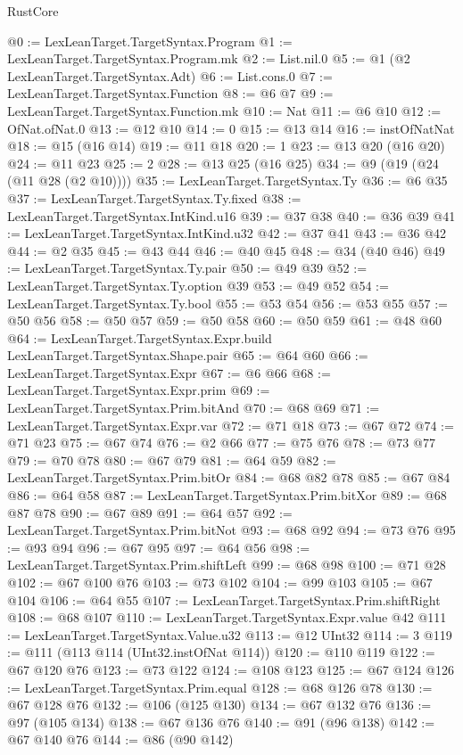 \begin{lexlean}{RustCore}
\begin{coremodule}
@0 := LexLeanTarget.TargetSyntax.Program
@1 := LexLeanTarget.TargetSyntax.Program.mk
@2 := List.nil.{0}
@5 := @1 (@2 LexLeanTarget.TargetSyntax.Adt)
@6 := List.cons.{0}
@7 := LexLeanTarget.TargetSyntax.Function
@8 := @6 @7
@9 := LexLeanTarget.TargetSyntax.Function.mk
@10 := Nat
@11 := @6 @10
@12 := OfNat.ofNat.{0}
@13 := @12 @10
@14 := 0
@15 := @13 @14
@16 := instOfNatNat
@18 := @15 (@16 @14)
@19 := @11 @18
@20 := 1
@23 := @13 @20 (@16 @20)
@24 := @11 @23
@25 := 2
@28 := @13 @25 (@16 @25)
@34 := @9 (@19 (@24 (@11 @28 (@2 @10))))
@35 := LexLeanTarget.TargetSyntax.Ty
@36 := @6 @35
@37 := LexLeanTarget.TargetSyntax.Ty.fixed
@38 := LexLeanTarget.TargetSyntax.IntKind.u16
@39 := @37 @38
@40 := @36 @39
@41 := LexLeanTarget.TargetSyntax.IntKind.u32
@42 := @37 @41
@43 := @36 @42
@44 := @2 @35
@45 := @43 @44
@46 := @40 @45
@48 := @34 (@40 @46)
@49 := LexLeanTarget.TargetSyntax.Ty.pair
@50 := @49 @39
@52 := LexLeanTarget.TargetSyntax.Ty.option @39
@53 := @49 @52
@54 := LexLeanTarget.TargetSyntax.Ty.bool
@55 := @53 @54
@56 := @53 @55
@57 := @50 @56
@58 := @50 @57
@59 := @50 @58
@60 := @50 @59
@61 := @48 @60
@64 := LexLeanTarget.TargetSyntax.Expr.build LexLeanTarget.TargetSyntax.Shape.pair
@65 := @64 @60
@66 := LexLeanTarget.TargetSyntax.Expr
@67 := @6 @66
@68 := LexLeanTarget.TargetSyntax.Expr.prim
@69 := LexLeanTarget.TargetSyntax.Prim.bitAnd
@70 := @68 @69
@71 := LexLeanTarget.TargetSyntax.Expr.var
@72 := @71 @18
@73 := @67 @72
@74 := @71 @23
@75 := @67 @74
@76 := @2 @66
@77 := @75 @76
@78 := @73 @77
@79 := @70 @78
@80 := @67 @79
@81 := @64 @59
@82 := LexLeanTarget.TargetSyntax.Prim.bitOr
@84 := @68 @82 @78
@85 := @67 @84
@86 := @64 @58
@87 := LexLeanTarget.TargetSyntax.Prim.bitXor
@89 := @68 @87 @78
@90 := @67 @89
@91 := @64 @57
@92 := LexLeanTarget.TargetSyntax.Prim.bitNot
@93 := @68 @92
@94 := @73 @76
@95 := @93 @94
@96 := @67 @95
@97 := @64 @56
@98 := LexLeanTarget.TargetSyntax.Prim.shiftLeft
@99 := @68 @98
@100 := @71 @28
@102 := @67 @100 @76
@103 := @73 @102
@104 := @99 @103
@105 := @67 @104
@106 := @64 @55
@107 := LexLeanTarget.TargetSyntax.Prim.shiftRight
@108 := @68 @107
@110 := LexLeanTarget.TargetSyntax.Expr.value @42
@111 := LexLeanTarget.TargetSyntax.Value.u32
@113 := @12 UInt32
@114 := 3
@119 := @111 (@113 @114 (UInt32.instOfNat @114))
@120 := @110 @119
@122 := @67 @120 @76
@123 := @73 @122
@124 := @108 @123
@125 := @67 @124
@126 := LexLeanTarget.TargetSyntax.Prim.equal
@128 := @68 @126 @78
@130 := @67 @128 @76
@132 := @106 (@125 @130)
@134 := @67 @132 @76
@136 := @97 (@105 @134)
@138 := @67 @136 @76
@140 := @91 (@96 @138)
@142 := @67 @140 @76
@144 := @86 (@90 @142)

\end{coremodule}
\end{lexlean}
